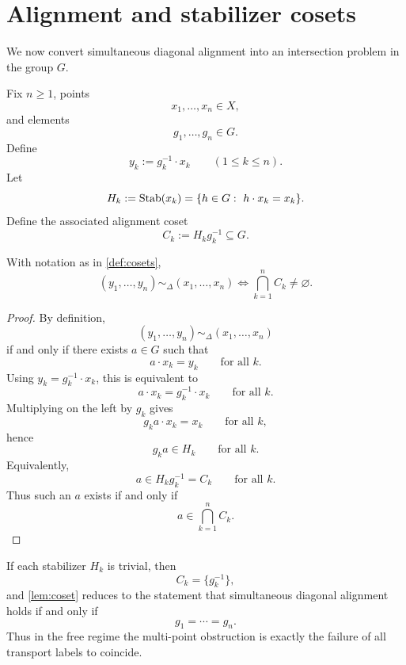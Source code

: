 \section{Alignment and stabilizer cosets}
We now convert simultaneous diagonal alignment into an intersection
problem in the group \(G\).
\begin{definition}
	\label{def:cosets}
	Fix \(n\ge 1\), points
	\[
		x_1,\dots,x_n\in X,
	\]
	and elements
	\[
		g_1,\dots,g_n\in G.
	\]
	Define
	\[
		y_k:=g_k^{-1}\cdot x_k
		\qquad
		(1\le k\le n).
	\]
	Let
	\[
		H_k:=\operatorname{Stab}(x_k)
		=
		\{h\in G:\ h\cdot x_k=x_k\}.
	\]
	Define the associated alignment coset
	\[
		C_k:=H_k g_k^{-1}\subseteq G.
	\]
\end{definition}
\begin{lemma}
	\label{lem:coset}
	With notation as in \cref{def:cosets},
	\[
		(y_1,\dots,y_n)\sim_\Delta (x_1,\dots,x_n)
		\iff
		\bigcap_{k=1}^n C_k\neq\varnothing.
	\]
\end{lemma}
\begin{proof}
	By definition,
	\[
		(y_1,\dots,y_n)\sim_\Delta (x_1,\dots,x_n)
	\]
	if and only if there exists \(a\in G\) such that
	\[
		a\cdot x_k=y_k
		\qquad
		\text{for all }k.
	\]
	Using \(y_k=g_k^{-1}\cdot x_k\), this is equivalent to
	\[
		a\cdot x_k=g_k^{-1}\cdot x_k
		\qquad
		\text{for all }k.
	\]
	Multiplying on the left by \(g_k\) gives
	\[
		g_k a\cdot x_k=x_k
		\qquad
		\text{for all }k,
	\]
	hence
	\[
		g_k a\in H_k
		\qquad
		\text{for all }k.
	\]
	Equivalently,
	\[
		a\in H_k g_k^{-1}=C_k
		\qquad
		\text{for all }k.
	\]
	Thus such an \(a\) exists if and only if
	\[
		a\in\bigcap_{k=1}^n C_k.
	\]
\end{proof}
\begin{remark}
	If each stabilizer \(H_k\) is trivial, then
	\[
		C_k=\{g_k^{-1}\},
	\]
	and \cref{lem:coset} reduces to the statement that simultaneous diagonal
	alignment holds if and only if
	\[
		g_1=\cdots=g_n.
	\]
	Thus in the free regime the multi-point obstruction is exactly the
	failure of all transport labels to coincide.
\end{remark}
